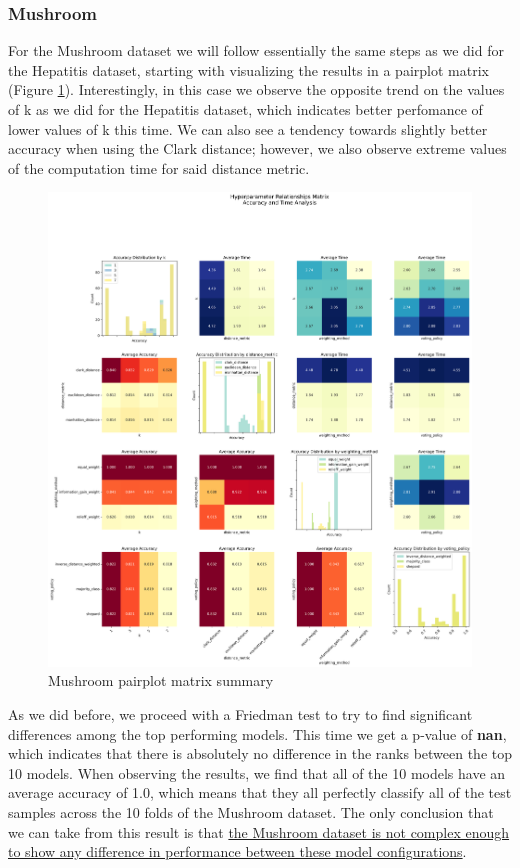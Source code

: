 \subsubsection{Mushroom}
For the Mushroom dataset we will follow essentially the same steps as we did for the Hepatitis dataset, starting with visualizing the results in a pairplot matrix (Figure \ref{fig:mush:pairplot}). Interestingly, in this case we observe the opposite trend on the values of k as we did for the Hepatitis dataset, which indicates better perfomance of lower values of k this time. We can also see a tendency towards slightly better accuracy when using the Clark distance; however, we also observe extreme values of the computation time for said distance metric.
\begin{figure}[t]
    \centering
    \includegraphics[width=\textwidth]{figures/knn/mushroom/hyperparameter_pairplot_matrix.png}
    \caption{Mushroom pairplot matrix summary}
    \label{fig:mush:pairplot}
\end{figure}

As we did before, we proceed with a Friedman test to try to find significant differences among the top performing models. This time we get a p-value of \textbf{nan}, which indicates that there is absolutely no difference in the ranks between the top 10 models. When observing the results, we find that all of the 10 models have an average accuracy of 1.0, which means that they all perfectly classify all of the test samples across the 10 folds of the Mushroom dataset. The only conclusion that we can take from this result is that \uline{the Mushroom dataset is not complex enough to show any difference in performance between these model configurations}.

